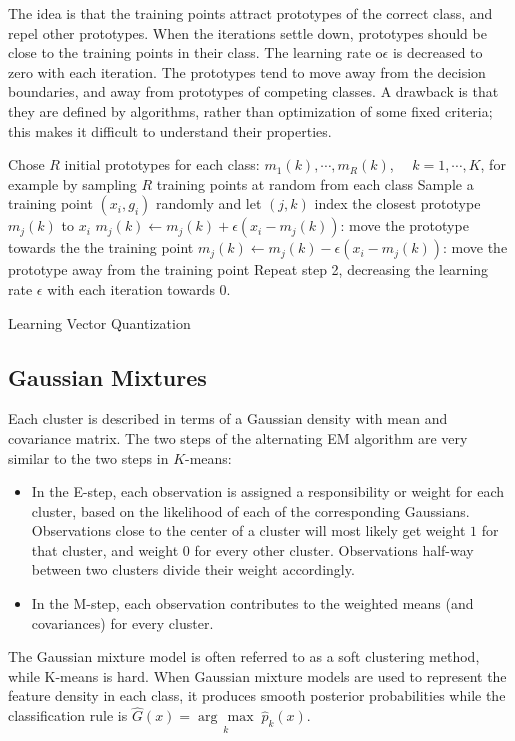 \documentclass[12pt, letterpaper]{article}
\theoremstyle{definition}
\newcommand{\argmax}[1]{\underset{#1}{\operatorname{arg}\,\operatorname{max}}\;}
\begin{document}
The idea is that the training points attract prototypes of the correct class, and repel other prototypes. When the iterations settle down, prototypes should be close to the training points in their class. The learning rate o$\epsilon$ is decreased to zero with each iteration. The prototypes tend to move away from the decision boundaries, and away from prototypes of competing classes.
A drawback is that they are defined by algorithms, rather than optimization of some fixed
criteria; this makes it difficult to understand their properties.
\begin{algorithm}[H]
\SetAlgoLined
Chose $R$ initial prototypes for each class: $m_1(k),\cdots, m_R(k)$, $\quad k=1,\cdots, K$, for example by sampling $R$ training points at random from each class\;
Sample a training point $(x_i, g_i)$ randomly and let $(j,k)$ index the closest prototype $m_j(k)$ to $x_i$\;
{
	$m_j (k) \leftarrow m_j(k) + \epsilon(x_i-m_j(k))$: move the prototype towards the the training point\;
}
{
	$m_j (k) \leftarrow m_j(k) - \epsilon(x_i-m_j(k))$: move the prototype away from the training point\;
}
Repeat step 2, decreasing the learning rate $\epsilon$ with each iteration towards $0$.
\caption{Learning Vector Quantization}
\end{algorithm}


\subsection{Gaussian Mixtures}
Each cluster is described in terms of a Gaussian density with mean and covariance matrix. The two steps of the alternating EM algorithm are very similar to the two steps in $K$-means:
\begin{itemize}
\item In the E-step, each observation is assigned a responsibility or weight for each cluster, based on the likelihood of each of the corresponding Gaussians. Observations close to the center of a cluster will most likely get weight $1$ for that cluster, and weight $0$ for every other cluster. Observations half-way between two clusters divide their weight accordingly.
\item In the M-step, each observation contributes to the weighted means (and covariances) for every cluster.
\end{itemize}
The Gaussian mixture model is often referred to as a soft clustering method, while K-means is hard. When Gaussian mixture models are used to represent the feature density in each class, it produces smooth posterior probabilities while the classification rule is $\hat{G}(x) = \argmax{k}{\hat{p}_k(x)}$.
\end{document}
